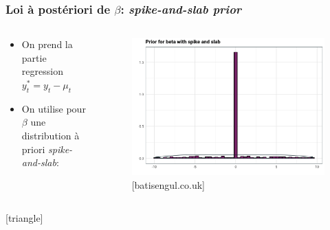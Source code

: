 \documentclass{presentation_template}
\begin{document}
\begin{frame}
    \frametitle{Loi à postériori de $\beta$: \textit{spike-and-slab prior}}
    \vspace{-1cm}
    \begin{columns}
        \begin{column}{0.8\textwidth}
            \vspace{-1cm}
            \begin{itemize}
                \item On prend la partie regression $y_{t}^{*}=y_{t}-\mu_{t}$
                \item On utilise pour $\beta$ une distribution à priori \textit{spike-and-slab}:
            \end{itemize}
            
        \end{column}
        \begin{column}{0.2\textwidth}

            \begin{figure}
                \includegraphics[width=\textwidth]{Figures/pike.png}
                \caption{[batisengul.co.uk]}
            \end{figure}
        
        \end{column}
\end{columns}
\vspace{-1.5cm}
       [triangle]
     
           
    

\end{frame}
\end{document}
